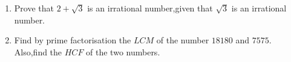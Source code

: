
\begin{enumerate}

\item Prove that $ 2+\sqrt3 $ is an irrational number,given that $ \sqrt3 $ is an irrational number.

\item Find by prime factorisation the $LCM$ of the number $18180$ and $7575$. Also,find the $HCF$ of the two numbers.


\end{enumerate}

